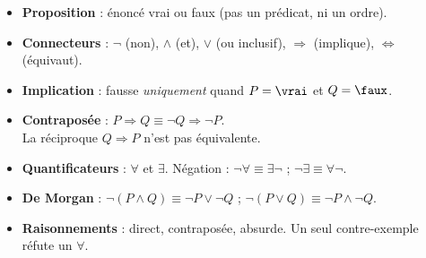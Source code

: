 \begin{bilan}
\begin{itemize}
  \item \textbf{Proposition} : \'enonc\'e vrai ou faux
        (pas un pr\'edicat, ni un ordre).
  \item \textbf{Connecteurs} :
        $\lnot$ (non), $\land$ (et), $\lor$ (ou inclusif),
        $\Rightarrow$ (implique), $\Leftrightarrow$ (\'equivaut).
  \item \textbf{Implication} : fausse \emph{uniquement} quand
        $P=\vrai$ et $Q=\faux$.
  \item \textbf{Contrapos\'ee} : $P\Rightarrow Q\equiv\lnot Q\Rightarrow\lnot P$. \\
        La r\'eciproque $Q\Rightarrow P$ n'est pas \'equivalente.
  \item \textbf{Quantificateurs} : $\forall$ et $\exists$.
        N\'egation : $\lnot\forall \equiv \exists\lnot$ ;
        $\lnot\exists \equiv \forall\lnot$.
  \item \textbf{De Morgan} :
        $\lnot(P\land Q)\equiv\lnot P\lor\lnot Q$ ;
        $\lnot(P\lor Q)\equiv\lnot P\land\lnot Q$.
  \item \textbf{Raisonnements} : direct, contrapos\'ee, absurde.
        Un seul contre-exemple r\'efute un $\forall$.
\end{itemize}
\end{bilan}

